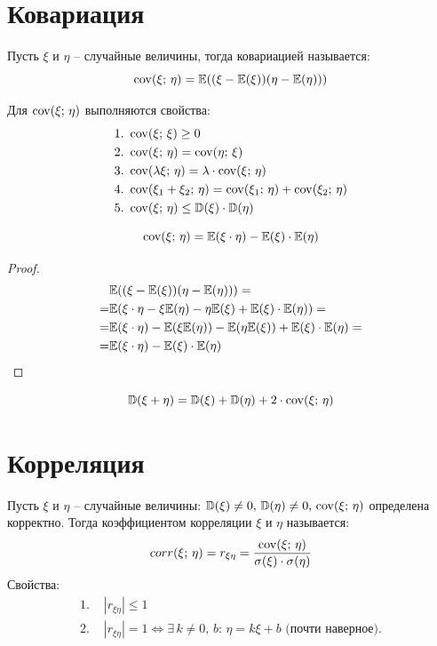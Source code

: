 \documentclass[12pt]{article}
\begin{document}
\section{Ковариация}

\begin{definition}
    Пусть $\xi$ и $\eta$ -- случайные величины, тогда ковариацией называется:
    $$\operatorname{cov}(\xi;\,\eta)=\mathbb{E}((\xi-\mathbb{E}(\xi))(\eta-\mathbb{E}(\eta)))$$
\end{definition}
\begin{theorem}
    Для $\operatorname{cov}(\xi;\,\eta)$ выполняются свойства:
    \begin{align*}
        1.\,\,&\operatorname{cov}(\xi;\,\xi)\geq0\\
        2.\,\,&\operatorname{cov}(\xi;\,\eta)=\operatorname{cov}(\eta;\,\xi)\\
        3.\,\,&\operatorname{cov}(\lambda \xi;\,\eta)=\lambda\cdot \operatorname{cov}(\xi;\,\eta)\\
        4.\,\,&\operatorname{cov}(\xi_1+\xi_2;\,\eta)=\operatorname{cov}(\xi_1;\,\eta)+\operatorname{cov}(\xi_2;\,\eta)\\
        5.\,\,&\operatorname{cov}(\xi;\,\eta)\leq \mathbb{D}(\xi)\cdot\mathbb{D}(\eta)
    \end{align*}
\end{theorem}
\begin{theorem}
    $$\operatorname{cov}(\xi;\,\eta)=\mathbb{E}(\xi\cdot\eta)-\mathbb{E}(\xi)\cdot\mathbb{E}(\eta)$$
\end{theorem}
\begin{proof}
    \begin{align*}
        &\mathbb{E}((\xi-\mathbb{E}(\xi))(\eta-\mathbb{E}(\eta)))=\\
        =&\mathbb{E}(\xi\cdot\eta-\xi\mathbb{E}(\eta)-\eta\mathbb{E}(\xi)+\mathbb{E}(\xi)\cdot\mathbb{E}(\eta))=\\
        =&\mathbb{E}(\xi\cdot\eta)-\mathbb{E}(\xi\mathbb{E}(\eta))-\mathbb{E}(\eta\mathbb{E}(\xi))+\mathbb{E}(\xi)\cdot\mathbb{E}(\eta)=\\
        =&\mathbb{E}(\xi\cdot\eta)-\mathbb{E}(\xi)\cdot\mathbb{E}(\eta)
    \end{align*}
\end{proof}
\begin{theorem}
    $$\mathbb{D}(\xi+\eta)=\mathbb{D}(\xi)+\mathbb{D}(\eta)+2\cdot \operatorname{cov}(\xi;\,\eta)$$
\end{theorem}
\section{Корреляция}

\begin{definition}
    Пусть $\xi$ и $\eta$ -- случайные величины: $\mathbb{D}(\xi)\neq0,\,\mathbb{D}(\eta)\neq0,\,\operatorname{cov}(\xi;\,\eta)$ определена корректно. Тогда коэффициентом корреляции $\xi$ и $\eta$ называется:
    $$corr(\xi;\,\eta)=r_{\xi\eta}=\frac{\operatorname{cov}(\xi;\,\eta)}{\sigma(\xi)\cdot\sigma(\eta)}$$
    Свойства:
    \begin{align*}
        1.\,\,&|r_{\xi\eta}|\leq 1\\
        2.\,\,&|r_{\xi\eta}|=1\Longleftrightarrow \exists\, k\neq 0,\,b:\,\eta=k\xi+b\text{ (почти наверное).}
    \end{align*}
\end{definition}
\end{document}
